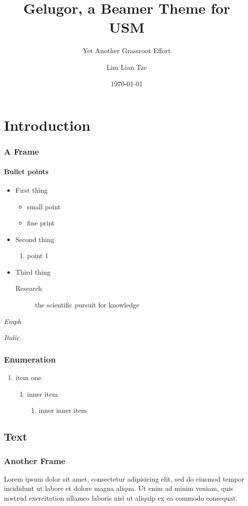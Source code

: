 \documentclass{beamer}
\title{Gelugor, a Beamer Theme for USM}
\subtitle{Yet Another Grassroot Effort}
\author{Lim Lian Tze}
\date{\today}
\institute[testing]{\url{liantze@gmail.com}\\\url{http://liantze.penguinattack.org/}}
\begin{document}
\maketitle


\section{Introduction}
\begin{frame}
\frametitle{A Frame}
\framesubtitle{Bullet points}
\begin{itemize}
\item First thing
	\begin{itemize}
	\item small point
	\item fine print
	\end{itemize}
\item Second thing
	\begin{enumerate}
	\item point 1
	\end{enumerate}
\item Third thing
	\begin{description}
	\item[Research] the scientific pursuit for knowledge
	\end{description}
\end{itemize}

\end{frame}

\begin{frame}
  \emph{Emph}

  \textit{Italic}

  \frametitle{Enumeration}
  \begin{enumerate}
    \item item one
      \begin{enumerate}
        \item inner item
          \begin{enumerate}
            \item inner inner item
          \end{enumerate}
      \end{enumerate}
  \end{enumerate}
\end{frame}

\subsection{Text}
\begin{frame}
\frametitle{Another Frame}
Lorem ipsum dolor sit amet, consectetur adipisicing elit, sed do eiusmod tempor incididunt ut labore et dolore magna aliqua. Ut enim ad minim veniam, quis nostrud exercitation ullamco laboris nisi ut aliquip ex ea commodo consequat.
\end{frame}
\end{document}
